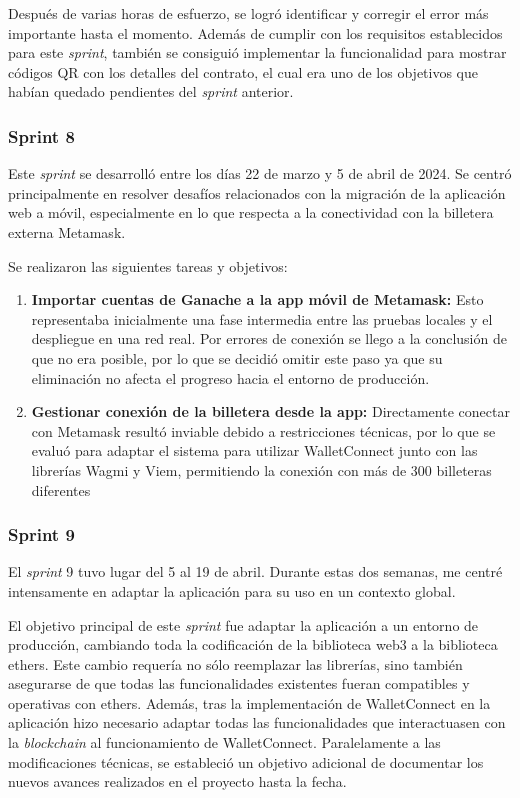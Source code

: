 Después de varias horas de esfuerzo, se logró identificar y corregir el error más importante hasta el momento. Además de cumplir con los requisitos establecidos para este \textit{sprint}, también se consiguió implementar la funcionalidad para mostrar códigos QR con los detalles del contrato, el cual era uno de los objetivos que habían quedado pendientes del \textit{sprint} anterior. 

\subsubsection{Sprint 8}

Este \textit{sprint} se desarrolló entre los días 22 de marzo y 5 de abril de 2024. Se centró principalmente en resolver desafíos relacionados con la migración de la aplicación web a móvil, especialmente en lo que respecta a la conectividad con la billetera externa Metamask.

Se realizaron las siguientes tareas y objetivos:

\begin{enumerate}

\item \textbf{Importar cuentas de Ganache a la app móvil de Metamask:} Esto representaba inicialmente una fase intermedia entre las pruebas locales y el despliegue en una red real.
Por errores de conexión se llego a la conclusión de que no era posible, por lo que se decidió omitir este paso ya que su eliminación no afecta el progreso hacia el entorno de producción.

\item \textbf{Gestionar conexión de la billetera desde la app:} Directamente conectar con Metamask resultó inviable debido a restricciones técnicas, por lo que se evaluó para adaptar el sistema para utilizar WalletConnect junto con las librerías Wagmi y Viem, permitiendo la conexión con más de 300 billeteras diferentes

\end{enumerate}

\subsubsection{Sprint 9}

El \textit{sprint} 9 tuvo lugar del 5 al 19 de abril. Durante estas dos semanas, me centré intensamente en adaptar la aplicación para su uso en un contexto global.

El objetivo principal de este \textit{sprint} fue adaptar la aplicación a un entorno de producción, cambiando toda la codificación de la biblioteca web3 a la biblioteca ethers. Este cambio requería no sólo reemplazar las librerías, sino también asegurarse de que todas las funcionalidades existentes fueran compatibles y operativas con ethers.
Además, tras la implementación de WalletConnect en la aplicación hizo necesario adaptar todas las funcionalidades que interactuasen con la \textit{blockchain} al funcionamiento de WalletConnect.
Paralelamente a las modificaciones técnicas, se estableció un objetivo adicional de documentar los nuevos avances realizados en el proyecto hasta la fecha. 

